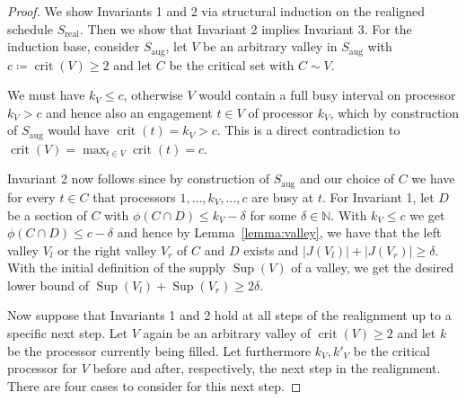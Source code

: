\documentclass[a4paper]{article}
\DeclareMathOperator{\aug}{aug}
\DeclareMathOperator{\real}{real}
\DeclareMathOperator{\crit}{crit}
\DeclareMathOperator{\fillop}{fill}
\DeclareMathOperator{\res}{Sup}
\begin{document}
\begin{proof}
  We show Invariants 1 and 2 via structural induction on the realigned schedule $S_{\real}$.
  Then we show that Invariant 2 implies Invariant 3.
  For the induction base, consider $S_{\aug}$, let $V$ be an arbitrary valley in $S_{\aug}$ with $c \coloneqq \crit(V) \geq 2$ and let $C$ be the critical set with $C \sim V$.

  We must have $k_V \leq c$, otherwise $V$ would contain a full busy interval on processor $k_V > c$ and hence also an engagement $t \in V$ of processor $k_V$, which by construction of $S_{\aug}$ would have $\crit(t) = k_V > c$.
  This is a direct contradiction to $\crit(V) = \max_{t \in V} \crit(t) = c$.

  Invariant 2 now follows since by construction of $S_{\aug}$ and our choice of $C$ we have for every $t \in C$ that processors $1, \ldots, k_V, \ldots, c$ are busy at $t$.
  For Invariant 1, let $D$ be a section of $C$ with $\phi(C \cap D) \leq k_V - \delta$ for some $\delta \in \mathbb{N}$.
  With $k_V \leq c$ we get $\phi(C \cap D) \leq c - \delta$ and hence by Lemma~\ref{lemma:valley}, we have that the left valley $V_l$ or the right valley $V_r$ of $C$ and $D$ exists and $|J(V_l)| + |J(V_r)| \geq \delta$.
  With the initial definition of the supply $\res(V)$ of a valley, we get the desired lower bound of $\res(V_l) + \res(V_r) \geq 2 \delta$.

  Now suppose that Invariants 1 and 2 hold at all steps of the realignment up to a specific next step.
  Let $V$ again be an arbitrary valley of $\crit(V) \geq 2$ and let $k$ be the processor currently being filled.
  Let furthermore $k_V, k'_V$ be the critical processor for $V$ before and after, respectively, the next step in the realignment.
  There are four cases to consider for this next step.


\end{proof}
\end{document}
